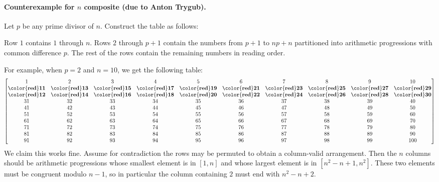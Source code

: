 \documentclass[11pt]{scrartcl}
\begin{document}
\paragraph{Counterexample for $n$ composite (due to Anton Trygub).}
Let $p$ be any prime divisor of $n$.
Construct the table as follows:
\begin{itemize}
  \ii Row $1$ contains $1$ through $n$.
  \ii Rows $2$ through $p+1$ contain the numbers from $p+1$ to $np+n$
  partitioned into arithmetic progressions with common difference $p$.
  \ii The rest of the rows contain the remaining numbers in reading order.
\end{itemize}
For example, when $p=2$ and $n=10$, we get the following table:
\[
  \begin{bmatrix}
    1 & 2 & 3 & 4 & 5 & 6 & 7 & 8 & 9 & 10 \\
    \mathbf{\color{red} 11} &
      \mathbf{\color{red} 13} &
      \mathbf{\color{red} 15} &
      \mathbf{\color{red} 17} &
      \mathbf{\color{red} 19} &
      \mathbf{\color{red} 21} &
      \mathbf{\color{red} 23} &
      \mathbf{\color{red} 25} &
      \mathbf{\color{red} 27} &
      \mathbf{\color{red} 29} \\
    \mathbf{\color{red} 12} &
      \mathbf{\color{red} 14} &
      \mathbf{\color{red} 16} &
      \mathbf{\color{red} 18} &
      \mathbf{\color{red} 20} &
      \mathbf{\color{red} 22} &
      \mathbf{\color{red} 24} &
      \mathbf{\color{red} 26} &
      \mathbf{\color{red} 28} &
      \mathbf{\color{red} 30} \\
    31 & 32 & 33 & 34 & 35 & 36 & 37 & 38 & 39 & 40 \\
    41 & 42 & 43 & 44 & 45 & 46 & 47 & 48 & 49 & 50 \\
    51 & 52 & 53 & 54 & 55 & 56 & 57 & 58 & 59 & 60 \\
    61 & 62 & 63 & 64 & 65 & 66 & 67 & 68 & 69 & 70 \\
    71 & 72 & 73 & 74 & 75 & 76 & 77 & 78 & 79 & 80 \\
    81 & 82 & 83 & 84 & 85 & 86 & 87 & 88 & 89 & 90 \\
    91 & 92 & 93 & 94 & 95 & 96 & 97 & 98 & 99 & 100
  \end{bmatrix}
\]
We claim this works fine.
Assume for contradiction the rows may be permuted to obtain
a column-valid arrangement.
Then the $n$ columns should be arithmetic progressions
whose smallest element is in $[1,n]$
and whose largest element is in $[n^2-n+1, n^2]$.
These two elements must be congruent modulo $n-1$,
so in particular the column containing $2$ must end with $n^2-n+2$.
\end{document}
